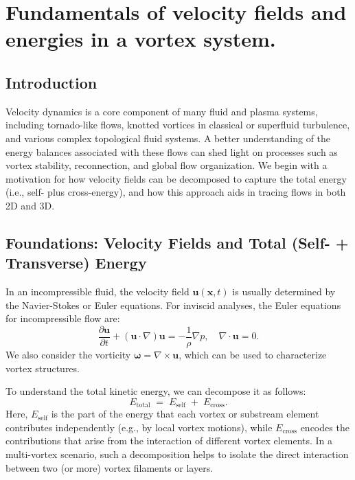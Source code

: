 \documentclass[preprint]{revtex4-2}
\begin{document}
\section{Fundamentals of velocity fields and energies in a vortex system.}
\label{sec:appendix:7}

\subsection{Introduction}
Velocity dynamics is a core component of many fluid and plasma systems, including
tornado-like flows, knotted vortices in classical or superfluid turbulence, and various
complex topological fluid systems. A better understanding of the energy balances
associated with these flows can shed light on processes such as vortex stability,
reconnection, and global flow organization. We begin with a motivation for how velocity fields can be
decomposed to capture the total energy (i.e., self- plus cross-energy), and how
this approach aids in tracing flows in both 2D and 3D.

\subsection{Foundations: Velocity Fields and Total (Self- + Transverse) Energy}
\label{sec:foundations}
In an incompressible fluid, the velocity field $\mathbf{u}(\mathbf{x}, t)$ is usually
determined by the Navier-Stokes or Euler equations. For inviscid analyses, the Euler equations for incompressible flow are:
\begin{equation}
   \frac{\partial \mathbf{u}}{\partial t} + (\mathbf{u} \cdot \nabla)\mathbf{u} = -\frac{1}{\rho}\nabla p,
   \quad \nabla \cdot \mathbf{u} = 0.\label{eq:appendix:Euler}
\end{equation}
We also consider the vorticity $\boldsymbol{\omega} = \nabla \times \mathbf{u}$,
which can be used to characterize vortex structures.

To understand the total kinetic energy, we can decompose it as follows:
\begin{equation}
   E_\text{total} \;=\; E_\text{self} \;+\; E_\text{cross}.\label{eq:appendix:total-energy}
\end{equation}
Here, $E_\text{self}$ is the part of the energy that each vortex or substream element contributes independently (e.g., by local vortex motions), while
$E_\text{cross}$ encodes the contributions that arise from the interaction of different
vortex elements. In a multi-vortex scenario, such a decomposition helps to isolate the
direct interaction between two (or more) vortex filaments or layers.
\end{document}
